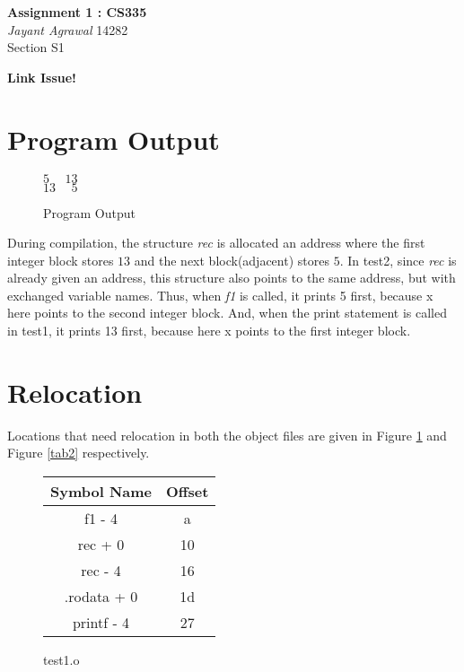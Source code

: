 \documentclass{article}
\begin{document}

\begin{center}
\textbf{\huge Assignment 1 : CS335} \\
\textit{\Large Jayant Agrawal}         14282 \\
Section S1
\end{center}

\textbf{\huge Link Issue!}

\section{Program Output}
\begin{figure}[h!]
\begin{center}
$5 \hspace{15pt} 13$ \\
$13 \hspace{15pt} 5$
\end{center}
\caption{Program Output}
\end{figure}

During compilation, the structure \emph{rec} is allocated an address where the first integer block stores $13$ and the next block(adjacent) stores $5$. In test2, since \emph{rec} is already given an address, this structure also points to the same address, but with exchanged variable names. Thus, when \emph{f1} is called, it prints 5 first, because x here points to the second integer block. And, when the print statement is called in test1, it prints 13 first, because here x points to the first integer block.
\section{Relocation}
Locations that need relocation in both the object files are given in Figure \ref{tab1} and Figure \ref{tab2} respectively.
\begin{figure}[h!]
\begin{center}
\begin{tabular}{|c|c|}
\hline
\textbf{Symbol Name} & \textbf{Offset} \\
\hline
f1 - 4  & a \\
rec + 0 & 10 \\
rec - 4 & 16 \\
.rodata + 0 & 1d \\
printf - 4 & 27\\
\hline
\end{tabular}
\caption{test1.o}
\label{tab1}
\end{center}
\end{figure}
\end{document}
